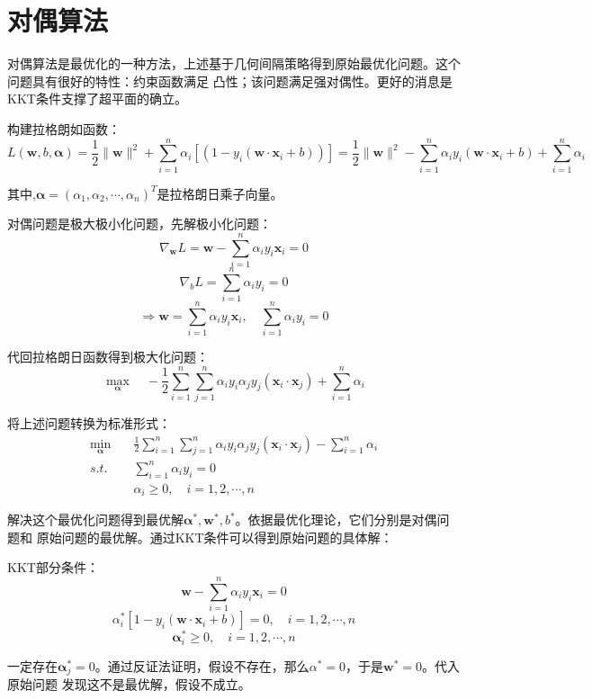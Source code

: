 \documentclass{article}
\begin{document}
    \section{对偶算法}
        对偶算法是最优化的一种方法，上述基于几何间隔策略得到原始最优化问题。这个问题具有很好的特性：约束函数满足
        凸性；该问题满足强对偶性。更好的消息是KKT条件支撑了超平面的确立。

        构建拉格朗如函数：
        \[L(\boldsymbol{w},b,\boldsymbol{\alpha })=\frac{1}{2}\|\boldsymbol{w}\|^2 +\sum_{i=1}^{n}\alpha_i[(1-y_i(\boldsymbol{w}\cdot \boldsymbol{x}_i+b))]=\frac{1}{2}\|\boldsymbol{w}\|^2-\sum_{i=1}^{n}\alpha_iy_i(\boldsymbol{w}\cdot \boldsymbol{x}_i+b)+\sum_{i=1}^{n}\alpha_i \]
        
        其中,$\boldsymbol{\alpha}=(\alpha_1,\alpha_2,\cdots,\alpha_n)^T$是拉格朗日乘子向量。

        对偶问题是极大极小化问题，先解极小化问题：
        \[\nabla_{\boldsymbol{w}}L=\boldsymbol{w}-\sum_{i=1}^{n}\alpha_iy_i\boldsymbol{x}_i=0\]
        \[\nabla_bL=\sum_{i=1}^{n}\alpha_iy_i=0\]
        \[\Rightarrow \boldsymbol{w}=\sum_{i=1}^{n}\alpha_iy_i\boldsymbol{x}_i,\quad\sum_{i=1}^{n}\alpha_iy_i=0\]
        
        代回拉格朗日函数得到极大化问题：
        \[\max_{\boldsymbol{\alpha}}\quad-\frac{1}{2}\sum_{i=1}^{n}\sum_{j=1}^{n}\alpha_iy_i\alpha_jy_j(\boldsymbol{x}_i\cdot \boldsymbol{x}_j)+\sum_{i=1}^{n}\alpha_i\]

        将上述问题转换为标准形式：
        \begin{align*}
            \min_{\boldsymbol{\alpha}}\quad & \frac{1}{2}\sum_{i=1}^{n}\sum_{j=1}^{n}\alpha_iy_i\alpha_jy_j(\boldsymbol{x}_i\cdot \boldsymbol{x}_j)-\sum_{i=1}^{n}\alpha_i\\
            s.t. \quad & \sum_{i=1}^{n}\alpha_iy_i=0 \\
                       & \alpha_i \ge 0,\quad i=1,2,\cdots,n
        \end{align*}

        解决这个最优化问题得到最优解$\boldsymbol{\alpha}^*,\boldsymbol{w}^*,b^*$。依据最优化理论，它们分别是对偶问题和
        原始问题的最优解。通过KKT条件可以得到原始问题的具体解：

        KKT部分条件：
        \[\boldsymbol{w}-\sum_{i=1}^{n}\alpha_iy_i\boldsymbol{x}_i=0\]
        \[\alpha_i^*[1-y_i(\boldsymbol{w}\cdot\boldsymbol{x}_i+b)]=0,\quad i=1,2,\cdots,n\]
        \[\boldsymbol{\alpha}_i^* \ge 0,\quad i=1,2,\cdots,n\]

        一定存在$\boldsymbol{\alpha}_j^*=0$。通过反证法证明，假设不存在，那么$\alpha^*=0$，于是$\boldsymbol{w}^*=0$。代入原始问题
        发现这不是最优解，假设不成立。
\end{document}
